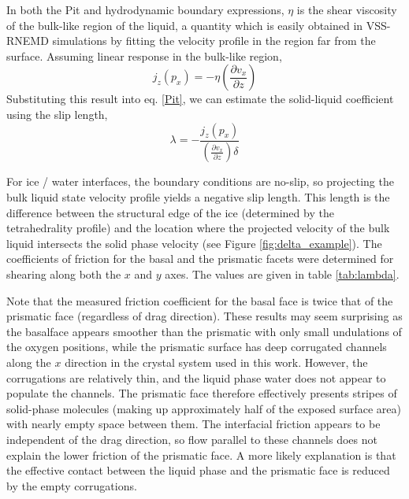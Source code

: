 In both the Pit and hydrodynamic boundary expressions, $\eta$ is the
shear viscosity of the bulk-like region of the liquid, a quantity
which is easily obtained in VSS-RNEMD simulations by fitting the
velocity profile in the region far from the surface.\cite{Kuang2012}
Assuming linear response in the bulk-like region,
\begin{equation}\label{Kuang}
j_{z}(p_{x})=-\eta \left(\frac{\partial v_{x}}{\partial z}\right)
\end{equation}
Substituting this result into eq. \eqref{Pit}, we can estimate the
solid-liquid coefficient using the slip length,
\begin{equation}
\lambda=-\frac{j_{z}(p_{x})} {\left(\frac{\partial v_{x}}{\partial
      z}\right) \delta}
\end{equation}

For ice / water interfaces, the boundary conditions are no-slip, so
projecting the bulk liquid state velocity profile yields a negative
slip length. This length is the difference between the structural edge
of the ice (determined by the tetrahedrality profile) and the location
where the projected velocity of the bulk liquid intersects the solid
phase velocity (see Figure \ref{fig:delta_example}). The coefficients
of friction for the basal and the prismatic facets were determined for
shearing along both the $x$ and $y$ axes.  The values are given in
table \ref{tab:lambda}. 

Note that the measured friction coefficient for the basal face is
twice that of the prismatic face (regardless of drag direction).
These results may seem surprising as the basalface appears smoother
than the prismatic with only small undulations of the oxygen
positions, while the prismatic surface has deep corrugated channels
along the $x$ direction in the crystal system used in this work.
However, the corrugations are relatively thin, and the liquid phase
water does not appear to populate the channels.  The prismatic face
therefore effectively presents stripes of solid-phase molecules
(making up approximately half of the exposed surface area) with nearly
empty space between them. The interfacial friction appears to be
independent of the drag direction, so flow parallel to these channels
does not explain the lower friction of the prismatic face.  A more
likely explanation is that the effective contact between the liquid
phase and the prismatic face is reduced by the empty corrugations.  

